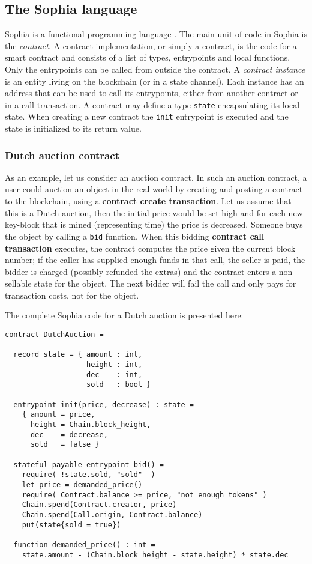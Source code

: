 \subsection{The Sophia language}

Sophia is a functional programming language \cite{hughes1989functional}.
The main unit of code in Sophia is the \textit{contract}.
A contract implementation, or simply a contract, is the code for a
smart contract and consists of a list of types, entrypoints and local
functions. Only the entrypoints can be called from outside the
contract.   A \textit{contract instance} is an entity living on the
blockchain (or in a state channel). Each instance has an address that
can be used to call its entrypoints, either from another contract or
in a call transaction.  A contract may define a type \texttt{state}
encapsulating its local state. When creating a new contract the
\texttt{init} entrypoint is executed and the state is initialized to its
return value.


\subsubsection{Dutch auction contract}

As an example, let us consider an auction contract.  In such an
auction contract, a user could auction an object in the real world by
creating and posting a contract to the blockchain, using a \textbf{contract
create transaction}. Let us assume that
this is a Dutch auction, then the initial price
would be set high and for each new key-block that is mined (representing
time) the price is decreased. Someone buys the object by calling a
\texttt{bid} function. When this bidding \textbf{contract call transaction}
executes,
the contract computes the price given the current block number; if the caller
has
supplied enough funds in that call, the seller is paid, the
bidder is charged (possibly refunded the extras) and the contract
enters a non sellable state for the object. The next bidder will fail
the call and only pays for transaction costs, not for the object.

The complete Sophia code for a Dutch auction is presented here:

\begin{verbatim}
contract DutchAuction =

  record state = { amount : int,
                   height : int,
                   dec    : int,
                   sold   : bool }

  entrypoint init(price, decrease) : state =
    { amount = price,
      height = Chain.block_height,
      dec    = decrease,
      sold   = false }

  stateful payable entrypoint bid() =
    require( !state.sold, "sold"  )
    let price = demanded_price()
    require( Contract.balance >= price, "not enough tokens" )
    Chain.spend(Contract.creator, price)
    Chain.spend(Call.origin, Contract.balance)
    put(state{sold = true})

  function demanded_price() : int =
    state.amount - (Chain.block_height - state.height) * state.dec

\end{verbatim}

